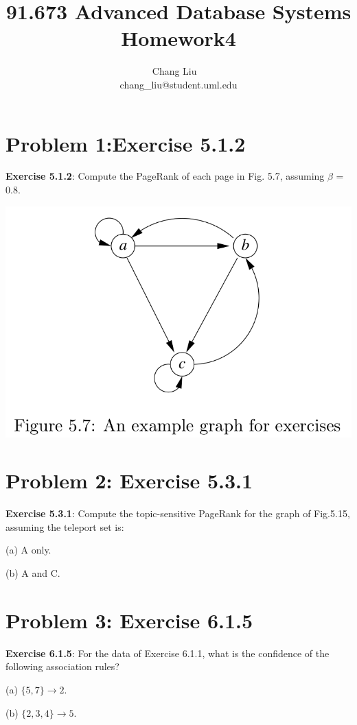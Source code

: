 \documentclass{article}
\author{Chang Liu ~\\ chang\_liu@student.uml.edu}
\title{91.673 Advanced Database Systems Homework4}
\begin{document}
\maketitle

\section{Problem 1:Exercise 5.1.2}

\textbf{Exercise 5.1.2}: Compute the PageRank of each page in Fig. 5.7, assuming $\beta$ = 0.8. ~\\
\begin{center}
\includegraphics[scale=0.3]{hw3-figure5_7.png}
\end{center}


\section{Problem 2: Exercise 5.3.1}
\textbf{Exercise 5.3.1}: Compute the topic-sensitive PageRank for the graph of Fig.5.15, assuming the teleport set is:

(a) A only.

(b) A and C.



\section{Problem 3: Exercise 6.1.5}

\textbf{Exercise 6.1.5}: For the data of Exercise 6.1.1, what is the confidence of the
following association rules?

(a) $\{5, 7\} \rightarrow  2$.

(b) $\{2, 3, 4\} \rightarrow 5$.
\end{document}
